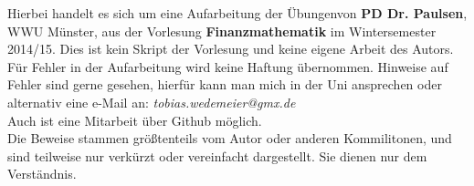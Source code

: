 

\newcommand{\vorlesung}{Finanzmathematik}
\newcommand{\Prof}{PD Dr. Paulsen}
\newcommand{\subt}{Aufarbeitung der Übungen}




\maketitle
\thispagestyle{empty}
\newpage

\thispagestyle{empty}
\vspace*{\fill}
\begin{center}
	Hierbei handelt es sich um eine \subt von \textbf{\Prof}, WWU Münster, aus der Vorlesung \textbf{\vorlesung} im Wintersemester 2014/15. Dies ist kein Skript der Vorlesung und keine eigene Arbeit des Autors.\\
	\vspace{2cm}
	Für Fehler in der Aufarbeitung wird keine Haftung übernommen. Hinweise auf Fehler sind gerne gesehen, hierfür kann man mich in der Uni ansprechen oder alternativ eine e-Mail an: \textit{tobias.wedemeier@gmx.de}\\
	Auch ist eine Mitarbeit über Github möglich.\\
	\vspace{2cm}
	Die Beweise stammen größtenteils vom Autor oder anderen Kommilitonen, und sind teilweise nur verkürzt oder vereinfacht dargestellt. Sie dienen nur dem Verständnis.
		
\end{center}
\vspace*{\fill}
\newpage
	
	
\tableofcontents
\cleardoubleoddemptypage %
	
\setcounter{page}{1}



\label{sub:zettel_1fima}

